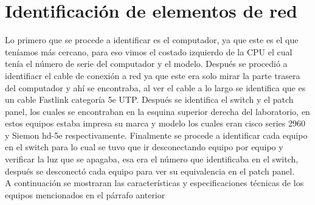 \documentclass{udpreport}
\begin{document}
	\section{Identificación de elementos de red}
		Lo primero que se procede a identificar es el computador, ya que este es el que teníamos más cercano, para eso vimos 		el costado izquierdo de la CPU el cual tenía el número de serie del computador y el modelo. Después se procedió a identifiacr 		el cable de conexión a red ya que este era solo mirar la parte trasera del computador y ahí se encontraba, al ver el cable 		a lo largo se identifica que es un cable Fastlink categoría 5e UTP. Después se identifica el switch y el patch panel, los 		cuales se encontraban en la esquina superior derecha del laboratorio, en estos equipos estaba impresa su marca y modelo 		los cuales eran cisco series 2960 y Siemon hd-5e respectivamente. Finalmente se procede a identificar cada equipo en 			el switch para lo cual se tuvo que ir desconectando equipo por equipo y verificar la luz que se apagaba, esa era el 		número que identificaba en el switch, después se desconectó cada equipo para ver su equivalencia en el patch panel.\\
		A continuación se mostraran las características y especificaciones técnicas de los equipos mencionados en el párrafo 			anterior\\
\end{document}

